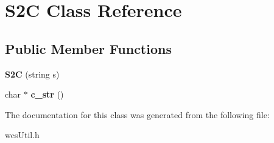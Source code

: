 \hypertarget{classS2C}{
\section{S2C Class Reference}
\label{classS2C}
}
\subsection*{Public Member Functions}
\begin{DoxyCompactItemize}
\item 
\hypertarget{classS2C_a1bc83eb080cbfbe7be081743342a75ca}{
{\bfseries S2C} (string s)}
\label{classS2C_a1bc83eb080cbfbe7be081743342a75ca}

\item 
\hypertarget{classS2C_abbb0cc88f841f21586c6622cb740c65f}{
char $\ast$ {\bfseries c\_\-str} ()}
\label{classS2C_abbb0cc88f841f21586c6622cb740c65f}

\end{DoxyCompactItemize}


The documentation for this class was generated from the following file:\begin{DoxyCompactItemize}
\item 
wcsUtil.h\end{DoxyCompactItemize}
